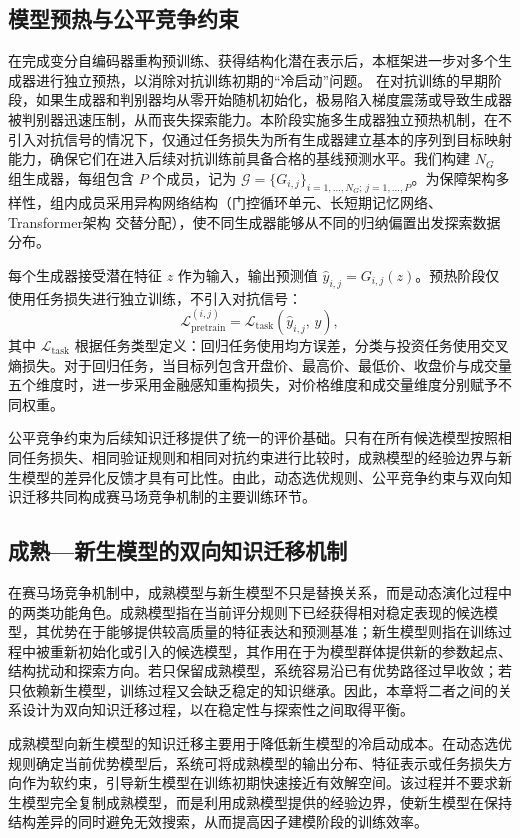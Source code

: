 \subsection{模型预热与公平竞争约束}
在完成变分自编码器重构预训练、获得结构化潜在表示后，本框架进一步对多个生成器进行独立预热，以消除对抗训练初期的“冷启动”问题。
在对抗训练的早期阶段，如果生成器和判别器均从零开始随机初始化，极易陷入梯度震荡或导致生成器被判别器迅速压制，从而丧失探索能力。本阶段实施多生成器独立预热机制，在不引入对抗信号的情况下，仅通过任务损失为所有生成器建立基本的序列到目标映射能力，确保它们在进入后续对抗训练前具备合格的基线预测水平。我们构建 $N_G$ 组生成器，每组包含 $P$ 个成员，记为 $\mathcal{G} = \{G_{i,j}\}_{i=1,\ldots,N_G;\, j=1,\ldots,P}$。为保障架构多样性，组内成员采用异构网络结构（门控循环单元、长短期记忆网络、Transformer架构 交替分配），使不同生成器能够从不同的归纳偏置出发探索数据分布。

每个生成器接受潜在特征 $z$ 作为输入，输出预测值 $\hat{y}_{i,j} = G_{i,j}(z)$。预热阶段仅使用任务损失进行独立训练，不引入对抗信号：
\begin{equation}
\mathcal{L}_{\text{pretrain}}^{(i,j)} = \mathcal{L}_{\text{task}}(\hat{y}_{i,j},\, y),
\end{equation}
其中 $\mathcal{L}_{\text{task}}$ 根据任务类型定义：回归任务使用均方误差，分类与投资任务使用交叉熵损失。对于回归任务，当目标列包含开盘价、最高价、最低价、收盘价与成交量五个维度时，进一步采用金融感知重构损失，对价格维度和成交量维度分别赋予不同权重。

公平竞争约束为后续知识迁移提供了统一的评价基础。只有在所有候选模型按照相同任务损失、相同验证规则和相同对抗约束进行比较时，成熟模型的经验边界与新生模型的差异化反馈才具有可比性。由此，动态选优规则、公平竞争约束与双向知识迁移共同构成赛马场竞争机制的主要训练环节。

\subsection{成熟—新生模型的双向知识迁移机制}
在赛马场竞争机制中，成熟模型与新生模型不只是替换关系，而是动态演化过程中的两类功能角色。成熟模型指在当前评分规则下已经获得相对稳定表现的候选模型，其优势在于能够提供较高质量的特征表达和预测基准；新生模型则指在训练过程中被重新初始化或引入的候选模型，其作用在于为模型群体提供新的参数起点、结构扰动和探索方向。若只保留成熟模型，系统容易沿已有优势路径过早收敛；若只依赖新生模型，训练过程又会缺乏稳定的知识继承。因此，本章将二者之间的关系设计为双向知识迁移过程，以在稳定性与探索性之间取得平衡。

成熟模型向新生模型的知识迁移主要用于降低新生模型的冷启动成本。在动态选优规则确定当前优势模型后，系统可将成熟模型的输出分布、特征表示或任务损失方向作为软约束，引导新生模型在训练初期快速接近有效解空间。该过程并不要求新生模型完全复制成熟模型，而是利用成熟模型提供的经验边界，使新生模型在保持结构差异的同时避免无效搜索，从而提高因子建模阶段的训练效率。

